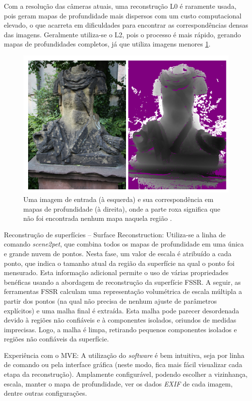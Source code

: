 Com a resolução das câmeras atuais, uma reconstrução L0 é raramente usada, pois geram mapas de profundidade mais dispersos com um custo computacional elevado, o que acarreta em dificuldades para encontrar as correspondências densas das imagens. Geralmente utiliza-se o L2, pois o processo é mais rápido, gerando mapas de profundidades completos, já que utiliza imagens menores \ref{fig:mvedepth}.

\begin{figure}[!h]
	\centering
	\includegraphics[width=0.5\linewidth]{figs/mvedepth.png}
	\caption{%
	Uma imagem de entrada (à esquerda) e sua correspondência em mapas de profundidade (à direita), onde a parte roxa significa que não foi encontrada nenhum mapa naquela região \cite{mve}.
	}\label{fig:mvedepth}
\end{figure}


Reconstrução de superfícies -- {Surface Reconstruction}: Utiliza-se a linha de comando \emph{scene2pet}, que combina todos os mapas de profundidade em uma única e grande nuvem de pontos. Nesta fase, um valor de escala é atribuído a cada ponto, que indica o tamanho atual da região da superfície na qual o ponto foi mensurado. Esta informação adicional permite o uso de várias propriedades benéficas usando a abordagem de reconstrução da superfície FSSR. %
A seguir, as ferramentas FSSR calculam uma representação volumétrica de escala múltipla a partir dos pontos (na qual não precisa de nenhum ajuste de parâmetros explícitos) e uma malha final é extraída. Esta malha pode parecer desordenada devido à regiões não confiáveis e à componentes isolados, oriundos de medidas imprecisas. Logo, a malha é limpa, retirando pequenos componentes isolados e regiões não confiáveis da superfície. 


Experiência com o MVE: A utilização do \emph{software} é bem intuitiva, seja por linha de comando ou pela interface gráfica (neste modo, fica mais fácil visualizar cada etapa da reconstrução). Amplamente configurável, podendo escolher a vizinhança, escala, manter o mapa de profundidade, ver os dados \emph{EXIF} de cada imagem, dentre outras configurações.

